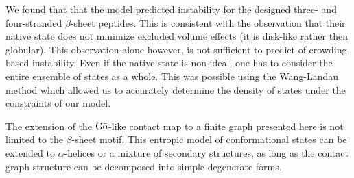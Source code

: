We found that that the model predicted instability for the designed three- and four-stranded $\beta$-sheet peptides. This is consistent with the observation that their native state does not minimize excluded volume effects (it is disk-like rather then globular). This observation alone however, is not sufficient to predict of crowding based instability. Even if the native state is non-ideal, one has to consider the entire ensemble of states as a whole. This was possible using the Wang-Landau method which allowed us to accurately determine the density of states under the constraints of our model.  

The extension of the $\text{G}\bar{\text{o}}$-like contact map to a finite graph presented here is not limited to the $\beta$-sheet motif. This entropic model of conformational states can be extended to $\alpha$-helices or a mixture of secondary structures, as long as the contact graph structure can be decomposed into simple degenerate forms. 

